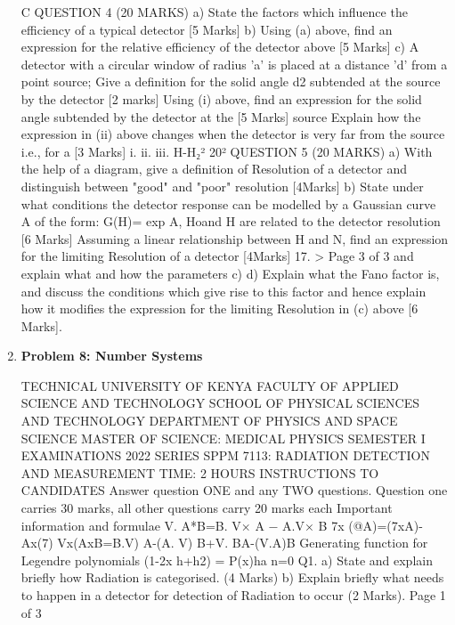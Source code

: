 \documentclass[12pt]{article}  %
\begin{document}
\begin{enumerate}
C
QUESTION 4 (20 MARKS)
a) State the factors which influence the efficiency of a typical detector
[5 Marks]
b) Using (a) above, find an expression for the relative efficiency of the detector above
[5 Marks]
c) A detector with a circular window of radius 'a' is placed at a distance 'd' from a point
source;
Give a definition for the solid angle d2 subtended at the source by the detector
[2 marks]
Using (i) above, find an expression for the solid angle subtended by the detector at the
[5 Marks]
source
Explain how the expression in (ii) above changes when the detector is very far from
the source i.e., for a
[3 Marks]
i.
ii.
iii.
H-H₂²
20²
QUESTION 5 (20 MARKS)
a) With the help of a diagram, give a definition of Resolution of a detector and distinguish
between "good" and "poor" resolution
[4Marks]
b) State under what conditions the detector response can be modelled by a Gaussian curve
A
of the form: G(H)= exp
A, Hoand H are related to the detector resolution
[6 Marks]
Assuming a linear relationship between H and N, find an expression for the limiting
Resolution of a detector
[4Marks]
17.
>
Page 3 of 3
and explain what and how the parameters
c)
d) Explain what the Fano factor is, and discuss the conditions which give rise to this factor
and hence explain how it modifies the expression for the limiting Resolution in (c) above
[6 Marks].


\item \textbf{Problem 8: Number Systems} ﻿

TECHNICAL UNIVERSITY OF KENYA
FACULTY OF APPLIED SCIENCE AND TECHNOLOGY SCHOOL OF PHYSICAL SCIENCES AND TECHNOLOGY DEPARTMENT OF PHYSICS AND SPACE SCIENCE MASTER OF SCIENCE: MEDICAL PHYSICS
SEMESTER I EXAMINATIONS
2022 SERIES
SPPM 7113: RADIATION DETECTION AND MEASUREMENT TIME: 2 HOURS
INSTRUCTIONS TO CANDIDATES
Answer question ONE and any TWO questions.
Question one carries 30 marks, all other questions carry 20 marks each
Important information and formulae
V. A*B=B. V× A − A.V× B
7x (@A)=(7xA)-Ax(7)
Vx(AxB=B.V) A-(A. V) B+V. BA-(V.A)B
Generating function for Legendre polynomials
(1-2x h+h2) = P(x)ha
n=0
Q1.
a) State and explain briefly how Radiation is categorised. (4 Marks)
b) Explain briefly what needs to happen in a detector for detection of Radiation to occur (2 Marks).
Page 1 of 3

﻿


\end{enumerate}
\end{document}
